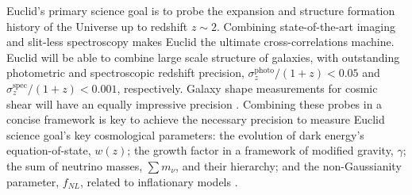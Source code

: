 \qquad Euclid's primary science goal is to probe the expansion and structure formation history of the Universe up to redshift $z\sim 2$. Combining state-of-the-art imaging and slit-less spectroscopy makes Euclid the ultimate cross-correlations machine. Euclid will be able to combine large scale structure of galaxies, with outstanding photometric and spectroscopic redshift precision, $\sigma^{\text{photo}}_z/(1+z) < 0.05$ and  $\sigma^{\text{spec}}_z/(1+z)< 0.001$, respectively. Galaxy shape measurements for cosmic shear will have an equally impressive precision \citep{2016SartorisEuclid,2016SellentinWLEuclid}. Combining these probes in a concise framework is key to achieve the necessary precision to measure Euclid science goal's key cosmological parameters: the evolution of dark energy's equation-of-state, $w(z)$; the growth factor in a framework of modified gravity, $\gamma$; the sum of neutrino masses, $\sum m_{\nu}$, and their hierarchy; and the non-Gaussianity parameter, $f_{NL}$, related to inflationary models \citep{2011EuclidRedPaper}.

